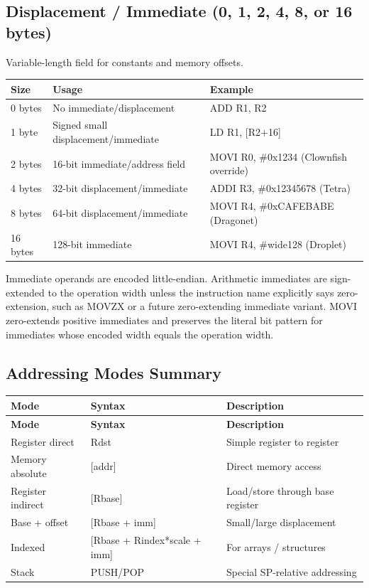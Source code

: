 \documentclass[11pt]{article}
\begin{document}
\subsection{Displacement / Immediate (0, 1, 2, 4, 8, or 16 bytes)}

Variable-length field for constants and memory offsets.

\begin{table}[h]
\centering
\begin{tabular}{@{}lll@{}}
\toprule
\textbf{Size} & \textbf{Usage} & \textbf{Example} \\ \midrule
0 bytes & No immediate/displacement & ADD R1, R2 \\
1 byte & Signed small displacement/immediate & LD R1, [R2+16] \\
2 bytes & 16-bit immediate/address field & MOVI R0, \#0x1234 (Clownfish override) \\
4 bytes & 32-bit displacement/immediate & ADDI R3, \#0x12345678 (Tetra) \\
8 bytes & 64-bit displacement/immediate & MOVI R4, \#0xCAFEBABE (Dragonet) \\
16 bytes & 128-bit immediate & MOVI R4, \#wide128 (Droplet) \\ \bottomrule
\end{tabular}
\end{table}

Immediate operands are encoded little-endian. Arithmetic immediates are sign-extended to the operation width unless the instruction name explicitly says zero-extension, such as MOVZX or a future zero-extending immediate variant. MOVI zero-extends positive immediates and preserves the literal bit pattern for immediates whose encoded width equals the operation width.

\subsection{Addressing Modes Summary}

\begin{longtable}{@{}lll@{}}
\toprule
\textbf{Mode} & \textbf{Syntax} & \textbf{Description} \\ \midrule
\endfirsthead
\toprule
\textbf{Mode} & \textbf{Syntax} & \textbf{Description} \\ \midrule
\endhead
Register direct & Rdst & Simple register to register \\
Memory absolute & [addr] & Direct memory access \\
Register indirect & [Rbase] & Load/store through base register \\
Base + offset & [Rbase + imm] & Small/large displacement \\
Indexed & [Rbase + Rindex*scale + imm] & For arrays / structures \\
Stack & PUSH/POP & Special SP-relative addressing \\ \bottomrule
\end{longtable}
\end{document}
